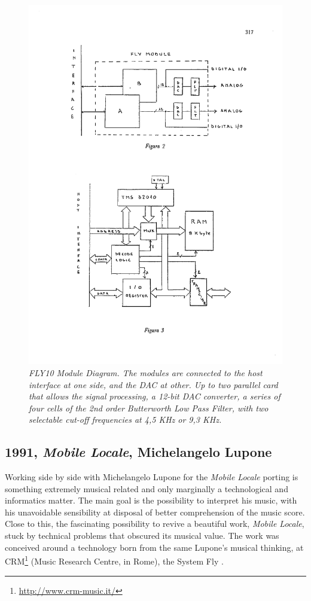 \documentclass[twoside,a4paper]{article}
\begin{document}
\begin{figure}[ht]
\centerline{\includegraphics[width=.45\textwidth]{img/lmfly10}}
\caption{\label{ml-fly10}{\it \emph{FLY10} Module Diagram. The modules are connected to the host interface at one side, and the DAC at other. Up to two parallel card that allows the signal processing, a 12-bit DAC converter, a series of four cells of the 2nd order Butterworth Low Pass Filter, with two selectable cut-off frequencies at 4,5 KHz or 9,3 KHz.
}}
\end{figure}

\subsection{1991, \emph{Mobile Locale}, Michelangelo Lupone}

Working side by side with Michelangelo Lupone for the \emph{Mobile Locale} \cite{lmml91} porting is something extremely musical related and only marginally a technological and informatics matter. The main goal is the possibility to interpret his music, with his unavoidable sensibility at disposal of better comprehension of the music score. Close to this, the fascinating possibility to revive a beautiful work, \emph{Mobile Locale}, stuck by technical problems that obscured its musical value. The work was conceived around a technology born from the same Lupone's musical thinking, at CRM\footnote{\url{http://www.crm-music.it/}} (Music Research Centre, in Rome), the System Fly \cite{ml85}. 

\end{document}
